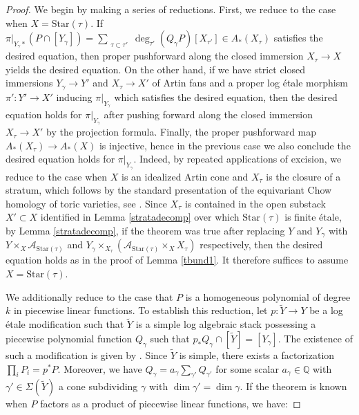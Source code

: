 \documentclass[12pt, oneside]{amsart}   	%
\numberwithin{equation}{section}
\numberwithin{thm}{section}
\numberwithin{figure}{section}
\begin{document}
\begin{proof}
We begin by making a series of reductions. First, we reduce to the case when $X = \text{Star}(\tau)$. If $\pi|_{Y_{\gamma}*}(P\cap[Y_{\gamma}]) =  \sum_{\substack{\tau\subset \tau'}} \deg_{\tau'}(Q_{\gamma}P)[X_{\tau'}] \in A_*(X_{\tau})$ satisfies the desired equation, then proper pushforward along the closed immersion $X_{\tau} \rightarrow X$ yields the desired equation. On the other hand, if we have strict closed immersions $Y_{\gamma} \rightarrow Y'$ and $X_{\tau} \rightarrow X'$ of Artin fans and a proper log \'etale morphism $\pi': Y' \rightarrow X'$ inducing $\pi|_{Y_{\gamma}}$ which satisfies the desired equation, then the desired equation holds for $\pi|_{Y_{\gamma}}$ after pushing forward along the closed immersion $X_{\tau} \rightarrow X'$ by the projection formula. Finally, the proper pushforward map $A_*(X_{\tau}) \rightarrow A_*(X)$ is injective, hence in the previous case we also conclude the desired equation holds for $\pi|_{Y_{\gamma}}$. Indeed, by repeated applications of excision, we reduce to the case when $X$ is an idealized Artin cone and $X_{\tau}$ is the closure of a stratum, which follows by the standard presentation of the equivariant Chow homology of toric varieties, see \cite[Theorem $2.1$]{eqchow}. Since $X_{\tau}$ is contained in the open substack $X' \subset X$ identified in Lemma \ref{stratadecomp} over which $\text{Star}(\tau)$ is finite \'etale, by Lemma \ref{stratadecomp}, if the theorem was true after replacing $Y$ and $Y_{\gamma}$ with $Y \times_{X} \mathcal{A}_{\text{Star}(\tau)}$ and $Y_{\gamma} \times_{X_{\tau}} (\mathcal{A}_{\text{Star}(\tau)}\times_X X_{\tau})$ respectively, then the desired equation holds as in the proof of Lemma \ref{tbund1}. It therefore suffices to assume $X = \text{Star}(\tau)$.


 We additionally reduce to the case that $P$ is a homogeneous polynomial of degree $k$ in piecewise linear functions. To establish this reduction, let $p: \widetilde{Y} \rightarrow Y$ be a log \'etale modification such that $\widetilde{Y}$ is a simple log algebraic stack possessing a piecewise polynomial function $Q_{\gamma}$ such that $p_*Q_{\gamma} \cap [\widetilde{Y}] = [Y_{\gamma}]$. The existence of such a modification is given by \cite[Lemma $3.6$]{intDR}. Since $\widetilde{Y}$ is simple, there exists a factorization $\prod_i P_i = p^*P$. Moreover, we have $Q_{\gamma}= a_{\gamma}\sum_{\gamma'} Q_{\gamma'}$ for some scalar $a_{\gamma} \in \mathbb{Q}$ with $\gamma' \in \Sigma(\widetilde{Y})$ a cone subdividing $\gamma$ with $\dim\gamma' = \dim\gamma$. If the theorem is known when $P$ factors as a product of piecewise linear functions, we have:


\end{proof}
\end{document}
